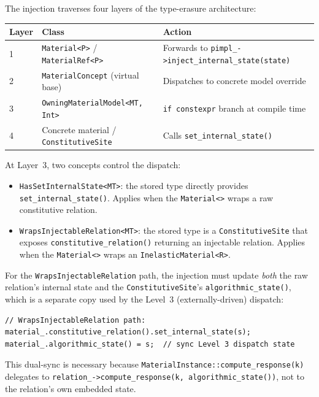 The injection traverses four layers of the type-erasure architecture:

\begin{center}
\small
\begin{tabular}{@{}lll@{}}
\toprule
\textbf{Layer} & \textbf{Class} & \textbf{Action} \\
\midrule
1 & \texttt{Material<P>} / \texttt{MaterialRef<P>}
  & Forwards to \texttt{pimpl\_->inject\_internal\_state(state)} \\
2 & \texttt{MaterialConcept} (virtual base)
  & Dispatches to concrete model override \\
3 & \texttt{OwningMaterialModel<MT, Int>}
  & \texttt{if constexpr} branch at compile time \\
4 & Concrete material / \texttt{ConstitutiveSite}
  & Calls \texttt{set\_internal\_state()} \\
\bottomrule
\end{tabular}
\end{center}

At Layer~3, two concepts control the dispatch:

\begin{itemize}
  \item \texttt{HasSetInternalState<MT>}: the stored type directly
    provides \texttt{set\_internal\_state()}.  Applies when the
    \texttt{Material<>} wraps a raw constitutive relation.
  \item \texttt{WrapsInjectableRelation<MT>}: the stored type is a
    \texttt{ConstitutiveSite} that exposes \texttt{constitutive\_relation()}
    returning an injectable relation.  Applies when the \texttt{Material<>}
    wraps an \texttt{InelasticMaterial<R>}.
\end{itemize}

For the \texttt{WrapsInjectableRelation} path, the injection must
update \emph{both} the raw relation's internal state and the
\texttt{ConstitutiveSite}'s \texttt{algorithmic\_state()}, which is
a separate copy used by the Level~3 (externally-driven) dispatch:
\begin{lstlisting}
// WrapsInjectableRelation path:
material_.constitutive_relation().set_internal_state(s);
material_.algorithmic_state() = s;  // sync Level 3 dispatch state
\end{lstlisting}

This dual-sync is necessary because
\texttt{MaterialInstance::compute\_response(k)} delegates to
\texttt{relation\_->compute\_response(k, algorithmic\_state())},
not to the relation's own embedded state.


